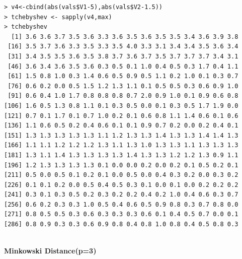 \documentclass[fontsize=10pt]{scrartcl}
\begin{document}
\begin{enumerate}
\begin{enumerate}
\begin{verbatim}
> v4<-cbind(abs(vals$V1-5),abs(vals$V2-1.5))
> tchebyshev <- sapply(v4,max)
> tchebyshev
  [1] 3.6 3.6 3.7 3.5 3.6 3.3 3.6 3.5 3.6 3.5 3.5 3.4 3.6 3.9 3.8
 [16] 3.5 3.7 3.6 3.3 3.5 3.3 3.5 4.0 3.3 3.1 3.4 3.4 3.5 3.6 3.4
 [31] 3.4 3.5 3.5 3.6 3.5 3.8 3.7 3.6 3.7 3.5 3.7 3.7 3.7 3.4 3.1
 [46] 3.6 3.4 3.6 3.5 3.6 0.3 0.5 0.1 1.0 0.4 0.5 0.3 1.7 0.4 1.1
 [61] 1.5 0.8 1.0 0.3 1.4 0.6 0.5 0.9 0.5 1.1 0.2 1.0 0.1 0.3 0.7
 [76] 0.6 0.2 0.0 0.5 1.5 1.2 1.3 1.1 0.1 0.5 0.5 0.3 0.6 0.9 1.0
 [91] 0.6 0.4 1.0 1.7 0.8 0.8 0.8 0.7 2.0 0.9 1.0 0.1 0.9 0.6 0.8
[106] 1.6 0.5 1.3 0.8 1.1 0.1 0.3 0.5 0.0 0.1 0.3 0.5 1.7 1.9 0.0
[121] 0.7 0.1 1.7 0.1 0.7 1.0 0.2 0.1 0.6 0.8 1.1 1.4 0.6 0.1 0.6
[136] 1.1 0.6 0.5 0.2 0.4 0.6 0.1 0.1 0.9 0.7 0.2 0.0 0.2 0.4 0.1
[151] 1.3 1.3 1.3 1.3 1.3 1.1 1.2 1.3 1.3 1.4 1.3 1.3 1.4 1.4 1.3
[166] 1.1 1.1 1.2 1.2 1.2 1.3 1.1 1.3 1.0 1.3 1.3 1.1 1.3 1.3 1.3
[181] 1.3 1.1 1.4 1.3 1.3 1.3 1.3 1.4 1.3 1.3 1.2 1.2 1.3 0.9 1.1
[196] 1.2 1.3 1.3 1.3 1.3 0.1 0.0 0.0 0.2 0.0 0.2 0.1 0.5 0.2 0.1
[211] 0.5 0.0 0.5 0.1 0.2 0.1 0.0 0.5 0.0 0.4 0.3 0.2 0.0 0.3 0.2
[226] 0.1 0.1 0.2 0.0 0.5 0.4 0.5 0.3 0.1 0.0 0.1 0.0 0.2 0.2 0.2
[241] 0.3 0.1 0.3 0.5 0.2 0.3 0.2 0.2 0.4 0.2 1.0 0.4 0.6 0.3 0.7
[256] 0.6 0.2 0.3 0.3 1.0 0.5 0.4 0.6 0.5 0.9 0.8 0.3 0.7 0.8 0.0
[271] 0.8 0.5 0.5 0.3 0.6 0.3 0.3 0.3 0.6 0.1 0.4 0.5 0.7 0.0 0.1
[286] 0.8 0.9 0.3 0.3 0.6 0.9 0.8 0.4 0.8 1.0 0.8 0.4 0.5 0.8 0.3


\end{verbatim}
			\textbf{\large Minkowski Distance(p=3)} \\


\end{enumerate}
\end{enumerate}
\end{document}
